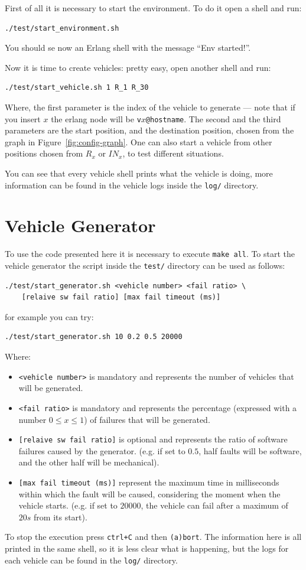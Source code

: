 \documentclass{memoir}
\begin{document}
First of all it is necessary to start the environment. To do it open a shell and run:
\begin{verbatim}
./test/start_environment.sh
\end{verbatim}
You should se now an Erlang shell with the message ``Env started!''.

Now it is time to create vehicles: pretty easy, open another shell and run:
\begin{verbatim}
./test/start_vehicle.sh 1 R_1 R_30
\end{verbatim}
Where, the first parameter is the index of the vehicle to generate --- note that if you insert $x$ the erlang node will be \verb|v|$x$\verb|@hostname|. The second and the third parameters are the start position, and the destination position, chosen from the graph in Figure~\ref{fig:config-graph}. One can also start a vehicle from other positions chosen from $R_x$ or $IN_x$, to test different situations.

You can see that every vehicle shell prints what the vehicle is doing, more information can be found in the vehicle logs inside the \texttt{log/} directory.

\section{Vehicle Generator}
To use the code presented here it is necessary to execute \texttt{make all}. To start the vehicle generator the script inside the \texttt{test/} directory can be used as follows:
\begin{verbatim}
./test/start_generator.sh <vehicle number> <fail ratio> \
	[relaive sw fail ratio] [max fail timeout (ms)]
\end{verbatim}
for example you can try:
\begin{verbatim}
./test/start_generator.sh 10 0.2 0.5 20000
\end{verbatim}
Where:
\begin{itemize}
	\item \verb|<vehicle number>| is mandatory and represents the number of vehicles that will be generated.
	\item \verb|<fail ratio>| is mandatory and represents the percentage (expressed with a number $0 \le x \le 1$) of failures that will be generated.
	\item \verb|[relaive sw fail ratio]| is optional and represents the ratio of software failures caused by the generator. (e.g. if set to $0.5$, half faults will be software, and the other half will be mechanical).
	\item \verb|[max fail timeout (ms)]| represent the maximum time in milliseconds within which the fault will be caused, considering the moment when the vehicle starts. (e.g. if set to $20000$, the vehicle can fail after a maximum of $20s$ from its start).
\end{itemize}
To stop the execution press \verb|ctrl+C| and then \verb|(a)bort|. The information here is all printed in the same shell, so it is less clear what is happening, but the logs for each vehicle can be found in the \verb|log/| directory.
\end{document}
